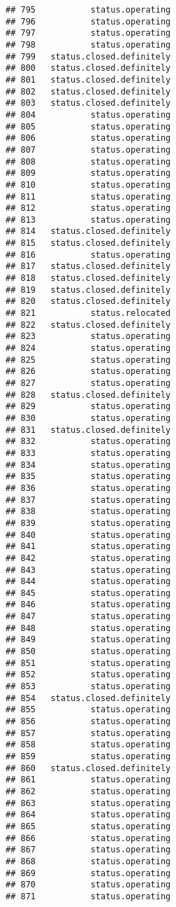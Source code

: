 \documentclass[
]{article}
\begin{document}
\begin{verbatim}
## 795           status.operating
## 796           status.operating
## 797           status.operating
## 798           status.operating
## 799   status.closed.definitely
## 800   status.closed.definitely
## 801   status.closed.definitely
## 802   status.closed.definitely
## 803   status.closed.definitely
## 804           status.operating
## 805           status.operating
## 806           status.operating
## 807           status.operating
## 808           status.operating
## 809           status.operating
## 810           status.operating
## 811           status.operating
## 812           status.operating
## 813           status.operating
## 814   status.closed.definitely
## 815   status.closed.definitely
## 816           status.operating
## 817   status.closed.definitely
## 818   status.closed.definitely
## 819   status.closed.definitely
## 820   status.closed.definitely
## 821           status.relocated
## 822   status.closed.definitely
## 823           status.operating
## 824           status.operating
## 825           status.operating
## 826           status.operating
## 827           status.operating
## 828   status.closed.definitely
## 829           status.operating
## 830           status.operating
## 831   status.closed.definitely
## 832           status.operating
## 833           status.operating
## 834           status.operating
## 835           status.operating
## 836           status.operating
## 837           status.operating
## 838           status.operating
## 839           status.operating
## 840           status.operating
## 841           status.operating
## 842           status.operating
## 843           status.operating
## 844           status.operating
## 845           status.operating
## 846           status.operating
## 847           status.operating
## 848           status.operating
## 849           status.operating
## 850           status.operating
## 851           status.operating
## 852           status.operating
## 853           status.operating
## 854   status.closed.definitely
## 855           status.operating
## 856           status.operating
## 857           status.operating
## 858           status.operating
## 859           status.operating
## 860   status.closed.definitely
## 861           status.operating
## 862           status.operating
## 863           status.operating
## 864           status.operating
## 865           status.operating
## 866           status.operating
## 867           status.operating
## 868           status.operating
## 869           status.operating
## 870           status.operating
## 871           status.operating

\end{verbatim}
\end{document}
